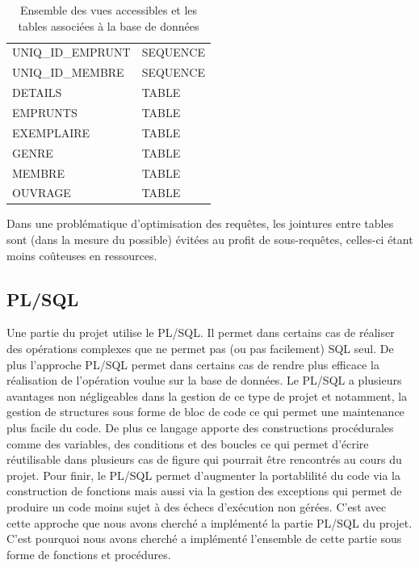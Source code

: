 \documentclass[11pt,a4paper]{article}
\begin{document}
\begin{table}[h!]
\begin{tabular}{@{}l|l|@{}}
    \multicolumn{1}{|l|}{UNIQ\_ID\_EMPRUNT} & SEQUENCE \\
    \multicolumn{1}{|l|}{UNIQ\_ID\_MEMBRE} & SEQUENCE \\ \midrule
    \multicolumn{1}{|l|}{DETAILS} & TABLE \\
    \multicolumn{1}{|l|}{EMPRUNTS} & TABLE \\
    \multicolumn{1}{|l|}{EXEMPLAIRE} & TABLE \\
    \multicolumn{1}{|l|}{GENRE} & TABLE \\
    \multicolumn{1}{|l|}{MEMBRE} & TABLE \\
    \multicolumn{1}{|l|}{OUVRAGE} & TABLE \\ \bottomrule
    \end{tabular}
    \caption{Ensemble des vues accessibles et les tables associées à la base de données}
    \label{vues}
\end{table}


\par
Dans une problématique d'optimisation des requêtes, les jointures entre tables sont (dans la mesure du possible) évitées au profit de sous-requêtes, celles-ci étant moins coûteuses en ressources.

\subsection{PL/SQL}
Une partie du projet utilise le PL/SQL. Il permet dans certains cas de réaliser des opérations complexes que ne permet pas (ou pas facilement) SQL seul. De plus l'approche PL/SQL permet dans certains cas de rendre plus efficace la réalisation de l'opération voulue sur la base de données. Le PL/SQL a plusieurs avantages non négligeables dans la gestion de ce type de projet et notamment, la gestion de structures sous forme de bloc de code ce qui permet une maintenance plus facile du code. De plus ce langage apporte des constructions procédurales comme des variables, des conditions et des boucles ce qui permet d'écrire réutilisable dans plusieurs cas de figure qui pourrait être rencontrés au cours du projet. Pour finir, le PL/SQL permet d'augmenter la portablilité du code via la construction de fonctions mais aussi via la gestion des exceptions qui permet de produire un code moins sujet à des échecs d'exécution non gérées. C'est avec cette approche que nous avons cherché a implémenté la partie PL/SQL du projet. C'est pourquoi nous avons cherché a implémenté l'ensemble de cette partie sous forme de fonctions et procédures.
\end{document}
